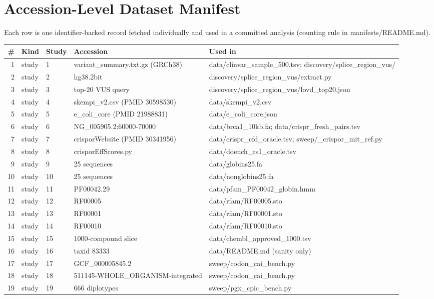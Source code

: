 \section{Accession-Level Dataset Manifest}
Each row is one identifier-backed record fetched individually and used in a committed analysis (counting rule in manifests/README.md).
{\scriptsize\begin{longtable}{rllp{3.2cm}p{4.2cm}}\hline \# & Kind & Study & Accession & Used in\\\hline\endhead
1 & study & 1 & variant\_summary.txt.gz (GRCh38) & data/clinvar\_sample\_500.tsv; discovery/splice\_region\_vus/\\
2 & study & 2 & hg38.2bit & discovery/splice\_region\_vus/extract.py\\
3 & study & 3 & top-20 VUS query & discovery/splice\_region\_vus/lovd\_top20.json\\
4 & study & 4 & skempi\_v2.csv (PMID 30598530) & data/skempi\_v2.csv\\
5 & study & 5 & e\_coli\_core (PMID 21988831) & data/e\_coli\_core.json\\
6 & study & 6 & NG\_005905.2:60000-70000 & data/brca1\_10kb.fa; data/crispr\_fresh\_pairs.tsv\\
7 & study & 7 & crisporWebsite (PMID 30341956) & data/crispr\_cfd\_oracle.tsv; sweep/\_crispor\_mit\_ref.py\\
8 & study & 8 & crisporEffScores.py & data/doench\_rs1\_oracle.tsv\\
9 & study & 9 & 25 sequences & data/globins25.fa\\
10 & study & 10 & 25 sequences & data/nonglobins25.fa\\
11 & study & 11 & PF00042.29 & data/pfam\_PF00042\_globin.hmm\\
12 & study & 12 & RF00005 & data/rfam/RF00005.sto\\
13 & study & 13 & RF00001 & data/rfam/RF00001.sto\\
14 & study & 14 & RF00010 & data/rfam/RF00010.sto\\
15 & study & 15 & 1000-compound slice & data/chembl\_approved\_1000.tsv\\
16 & study & 16 & taxid 83333 & data/README.md (sanity only)\\
17 & study & 17 & GCF\_000005845.2 & sweep/codon\_cai\_bench.py\\
18 & study & 18 & 511145-WHOLE\_ORGANISM-integrated & sweep/codon\_cai\_bench.py\\
19 & study & 19 & 666 diplotypes & sweep/pgx\_cpic\_bench.py\\

\end{longtable}}

